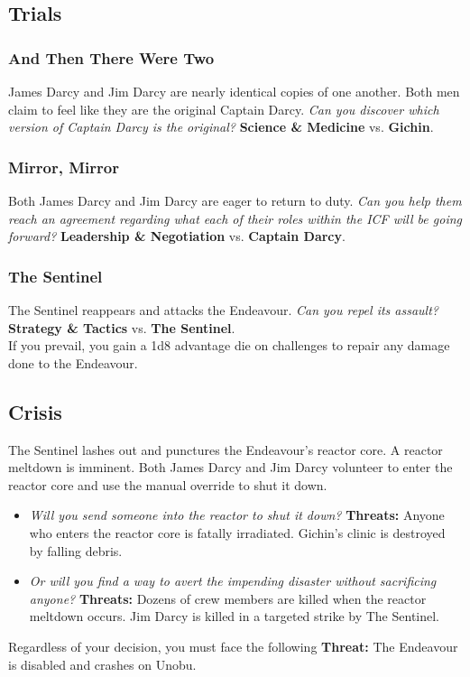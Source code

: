 \documentclass[11pt, a5paper, parskip=half-, DIV=12]{scrartcl}
\begin{document}
\subsection*{Trials}
\subsubsection*{And Then There Were Two}
James Darcy and Jim Darcy are nearly identical copies of one another. Both men claim to feel like they are the original Captain Darcy. \textit{Can you discover which version of Captain Darcy is the original?} \textbf{Science \& Medicine} vs. \textbf{Gichin}.

\subsubsection*{Mirror, Mirror}
Both James Darcy and Jim Darcy are eager to return to duty. \textit{Can you help them reach an agreement regarding what each of their roles within the ICF will be going forward?} \textbf{Leadership \& Negotiation} vs. \textbf{Captain Darcy}.

\subsubsection*{The Sentinel}
The Sentinel reappears and attacks the Endeavour. \textit{Can you repel its assault?} \textbf{Strategy \& Tactics} vs. \textbf{The Sentinel}. \\ If you prevail, you gain a 1d8 advantage die on challenges to repair any damage done to the Endeavour. 

\subsection*{Crisis}
The Sentinel lashes out and punctures the Endeavour's reactor core. A reactor meltdown is imminent. Both James Darcy and Jim Darcy volunteer to enter the reactor core and use the manual override to shut it down. 
\begin{itemize}
	\item \textit{Will you send someone into the reactor to shut it down?} \textbf{Threats:} Anyone who enters the reactor core is fatally irradiated. Gichin's clinic is destroyed by falling debris. 
	\item \textit{Or will you find a way to avert the impending disaster without sacrificing anyone?} \textbf{Threats:} Dozens of crew members are killed when the reactor meltdown occurs. Jim Darcy is killed in a targeted strike by The Sentinel.
\end{itemize}
Regardless of your decision, you must face the following \textbf{Threat:} The Endeavour is disabled and crashes on Unobu.
\newpage
\end{document}
